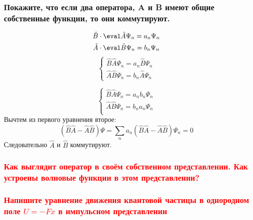 \subsubsection{Покажите, что если два оператора, A и B имеют общие собственные функции, то
они коммутируют.}


\begin{gather*}
	\hat{B}\cdot\eval \hat{A}\Psi_n=a_n\Psi_n \\
	\hat{A}\cdot\eval \hat{B}\Psi_n=b_n\Psi_n
\end{gather*}
\begin{equation*}
\begin{cases}
	\hat{B}\hat{A}\Psi_n=a_n\hat{B}\Psi_n \\
	\hat{A}\hat{B}\Psi_n=b_n\hat{A}\Psi_n
\end{cases}
\end{equation*}

\begin{equation*}
\begin{cases}
	\hat{B}\hat{A}\Psi_n=a_nb_n\Psi_n \\
	\hat{A}\hat{B}\Psi_n=b_na_n\Psi_n \\
\end{cases}
\end{equation*}
Вычтем из первого уравнения второе:
\begin{equation*}
	(\hat{B}\hat{A}-\hat{A}\hat{B})\Psi=\sum\limits_n a_n (\hat{B}\hat{A}-\hat{A}\hat{B})\Psi_n=0
\end{equation*}
Следовательно $\hat{A}$  и $\hat{B}$ коммутируют.

\subsubsection{\textcolor{red}{Как выглядит оператор в своём собственном представлении. Как устроены волновые функции в этом представлении?}}

\subsubsection{\textcolor{red}{Напишите уравнение движения квантовой частицы в однородном поле $U=-Fx$ в импульсном представлении}}